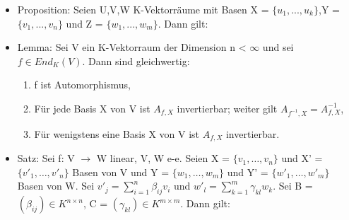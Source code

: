 \begin{itemize}
\item Proposition: Seien U,V,W K-Vektorräume mit Basen X = $\{u_1,...,u_k\}$,Y = $\{v_1,...,v_n\}$ und Z = $\{w_1,...,w_m\}$. Dann gilt:
\item Lemma: Sei V ein K-Vektorraum der Dimension n < $\infty$ und sei $f \in End_K (V)$. Dann sind gleichwertig:
\begin{enumerate}
\item f ist Automorphismus,
\item Für jede Basis X von V ist $A_{f,X}$ invertierbar; weiter gilt $A_{f^{-1},X} = A^{-1}_{f,X}$,
\item Für wenigstens eine Basis X von V ist $A_{f,X}$ invertierbar.
\end{enumerate}
\item Satz: Sei f: V $\to$ W linear, V, W e-e. Seien X = $\{v_1, …, v_n\}$ und X' = $\{v'_1, …, v'_n\}$ Basen von V und Y = $\{w_1, …, w_m\}$ und Y' = $\{w'_1, …, w'_m\}$ Basen von W. Sei $v'_j = \sum\nolimits_{i=1}^{n} \beta_{ij} v_i$ und $w'_l = \sum\nolimits_{k=1}^{m} \gamma_{kl} w_k$. Sei B = $(\beta_{ij}) \in K^{n \times n}$, C = $(\gamma_{kl}) \in K^{m \times m}$. Dann gilt:
\end{itemize}

